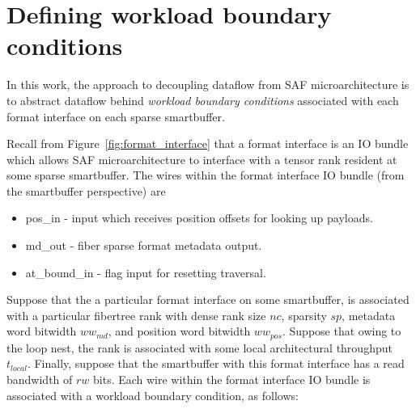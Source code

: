 \section{Defining workload boundary conditions}

In this work, the approach to decoupling dataflow from SAF microarchitecture is to abstract dataflow behind \textit{workload boundary conditions} associated with each format interface on each sparse smartbuffer.

Recall from Figure~\ref{fig:format_interface} that a format interface is an IO bundle which allows SAF microarchitecture to interface with a tensor rank resident at some sparse smartbuffer. The wires within the format interface IO bundle (from the smartbuffer perspective) are

\begin{itemize}
    \item pos\_in - input which receives position offsets for looking up payloads.
    \item md\_out - fiber sparse format metadata output.
    \item at\_bound\_in - flag input for resetting traversal.
\end{itemize}

Suppose that the a particular format interface on some smartbuffer, is associated with a particular fibertree rank with dense rank size $nc$, sparsity $sp$, metadata word bitwidth $ww_{md}$, and position word bitwidth $ww_{pos}$. Suppose that owing to the loop nest, the rank is associated with some local architectural throughput $t_{local}$. Finally, suppose that the smartbuffer with this format interface has a read bandwidth of $rw$ bits. Each wire within the format interface IO bundle is associated with a workload boundary condition, as follows:

